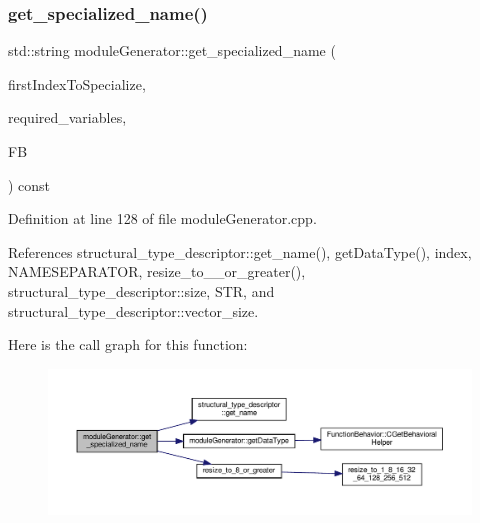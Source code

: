 \subsubsection{\texorpdfstring{get\+\_\+specialized\+\_\+name()}{get\_specialized\_name()}}
{\footnotesize\ttfamily std\+::string module\+Generator\+::get\+\_\+specialized\+\_\+name (\begin{DoxyParamCaption}\item[{unsigned int}]{first\+Index\+To\+Specialize,  }\item[{std\+::vector$<$ std\+::tuple$<$ unsigned int, unsigned int $>$$>$ \&}]{required\+\_\+variables,  }\item[{const \hyperlink{function__behavior_8hpp_a94872da12ed056b6ecf90456164e0213}{Function\+Behavior\+Const\+Ref}}]{FB }\end{DoxyParamCaption}) const}



Definition at line 128 of file module\+Generator.\+cpp.



References structural\+\_\+type\+\_\+descriptor\+::get\+\_\+name(), get\+Data\+Type(), index, N\+A\+M\+E\+S\+E\+P\+A\+R\+A\+T\+OR, resize\+\_\+to\+\_\+\_\+or\+\_\+greater(), structural\+\_\+type\+\_\+descriptor\+::size, S\+TR, and structural\+\_\+type\+\_\+descriptor\+::vector\+\_\+size.

Here is the call graph for this function\+:
\nopagebreak
\begin{figure}[H]
\begin{center}
\leavevmode
\includegraphics[width=350pt]{d4/d94/classmoduleGenerator_a0658c03088461302ffb01e68c4f1fb28_cgraph}
\end{center}
\end{figure}
\mbox{\label{classmoduleGenerator_a605b5c0840854b2854a3b966c23bd8ca}} 
